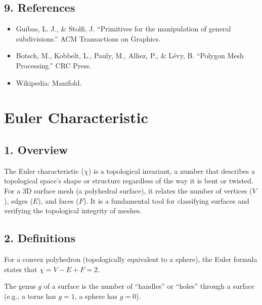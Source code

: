 \subsection{9. References}

\begin{itemize}
    \item Guibas, L. J., \& Stolfi, J. \cite{guibas1985} ``Primitives for the manipulation of general subdivisions.'' ACM Transactions on Graphics.
    \item Botsch, M., Kobbelt, L., Pauly, M., Alliez, P., \& L\'evy, B. \cite{botsch2010} ``Polygon Mesh Processing.'' CRC Press.
    \item Wikipedia: Manifold.
\end{itemize}

\section{Euler Characteristic}
\label{sec:euler_characteristic}

\subsection{1. Overview}

The Euler characteristic ($\chi$) is a topological invariant, a number that describes a topological space's shape or structure regardless of the way it is bent or twisted. For a 3D surface mesh (a polyhedral surface), it relates the number of vertices ($V$), edges ($E$), and faces ($F$). It is a fundamental tool for classifying surfaces and verifying the topological integrity of meshes\cite{euler1758,poincare1895}.

\subsection{2. Definitions}

\begin{definition}\label{def:euler_formula}
For a convex polyhedron (topologically equivalent to a sphere), the Euler formula states that $\chi = V - E + F = 2$.
\end{definition}

\begin{definition}[Genus]\label{def:genus}
The genus $g$ of a surface is the number of ``handles'' or ``holes'' through a surface (e.g., a torus has $g=1$, a sphere has $g=0$).
\end{definition}

